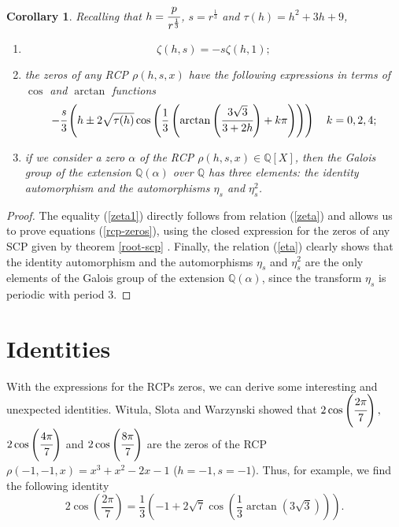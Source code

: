 \documentclass[12pt,reqno]{article}
\newtheorem{corollary}[theorem]{Corollary}
\begin{document}
\begin{corollary}\label{cor1}
Recalling that $h=\cfrac{p}{r^{\frac{1}{3}}}$, $s=r^{\frac{1}{3}}$ and $\tau(h)=h^2+3h+9$,   
\begin{enumerate}
\item \begin{equation}\label{zeta1} \zeta(h,s)=-s\zeta(h, 1);\end{equation}
\item the zeros of any RCP $\rho(h,s,x)$  have the following expressions in terms of $\cos$ and $\arctan$ functions
\begin{equation}\label{rcp-zeros} -\cfrac{s}{3}\left(h\pm2\sqrt{\tau(h)}\cos\left(\frac{1}{3}\left(\arctan\left(\cfrac{3\sqrt{3}}{3+2h}\right)+k\pi\right)\right)\right)\quad k=0,2,4; \end{equation}
\item if we consider a zero $\alpha$ of the RCP $\rho(h,s,x)\in \mathbb Q[X]$, then the Galois group of the extension $\mathbb Q(\alpha)$ over $\mathbb Q$ has three elements: the identity automorphism and the automorphisms $\eta_s$ and $\eta^2_s$.
\end{enumerate}
\end{corollary}
\begin{proof}
The equality (\ref{zeta1}) directly follows from relation (\ref{zeta}) and allows us to prove 
equations (\ref{rcp-zeros}), using the closed expression for the zeros of any SCP given by theorem \ref{root-scp} . Finally, the relation (\ref{eta}) clearly shows that the identity automorphism and the automorphisms $\eta_s$ and $\eta^2_s$ are the only elements of the Galois group of the extension $\mathbb Q(\alpha)$, since the transform $\eta_s$ is periodic with period 3.
\end{proof}

\section{Identities}
With the expressions for the RCPs zeros, we can derive some interesting and unexpected identities. Witula, Slota and Warzynski \cite{quasifib} showed that $2\cos\left(\cfrac{2\pi}{7}\right),$ $2\cos\left(\cfrac{4\pi}{7}\right)$ and $2\cos\left(\cfrac{8\pi}{7}\right)$ are the zeros of the RCP $\rho(-1,-1,x)=x^3+x^2-2x-1$ ($h=-1, s=-1$). Thus, for example, we find the following identity
$$2\cos\left(\frac{2\pi}{7}\right)=\frac{1}{3} \left(-1+2 \sqrt{7} \cos\left(\frac{1}{3} \arctan\left(3 \sqrt{3}\right)\right)\right).$$ 
 
\end{document}
